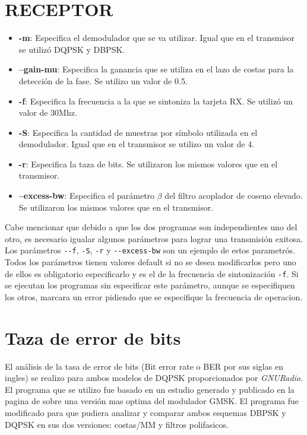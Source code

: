 \section*{RECEPTOR}
\begin{itemize}
  \item \textbf{-m}: Especifica el demodulador que se va utilizar. Igual que en el transmisor se
  utiliz\'o DQPSK y DBPSK.
  \item \textbf{--gain-mu}: Especifica la ganancia que se utiliza en el lazo de costas para la
  detecci\'on de la fase. Se utilizo un valor de 0.5.
  \item \textbf{-f}: Especifica la frecuencia a la que se sintoniza la tarjeta RX. Se utiliz\'o un
  valor de 30Mhz.
  \item \textbf{-S}: Especifica la cantidad de muestras por s\'imbolo utilizada en el demodulador.
  Igual que en el transmisor se utilizo un valor de 4.
  \item \textbf{-r}: Especifica la taza de bits. Se utilizaron los mismos valores que en el
  transmisor.
  \item \textbf{--excess-bw}: Especifica el par\'ametro $\beta$ del filtro acoplador de coseno
  elevado. Se utilizaron los mismos valores que en el transmisor.
\end{itemize}

Cabe mencionar que debido a que los dos programas son independientes uno del otro, es necesario
igualar algunos par\'ametros para lograr una transmisi\'on exitosa. Los par\'ametros \verb|--f|,
\verb|-S|, \verb|-r| y \verb|--excess-bw| son un ejemplo de estos parametr\'os. Todos los
par\'ametros tienen valores default si no se desea modificarlos pero uno de ellos es obligatorio
especificarlo y es el de la frecuencia de sintonizaci\'on \verb|-f|. Si se ejecutan los programas
sin especificar este par\'ametro, aunque se especifiquen los otros, marcara un error pidiendo que
se especifique la frecuencia de operacion. 
\section{Taza de error de bits}

El an\'alisis de la tasa de error de bits (Bit error rate o BER por sus siglas en ingles) se realizo
para ambos modelos de DQPSK proporcionados por \emph{GNURadio}. El programa que se utilizo fue
basado en un estudio generado y publicado en la pagina de \gnuradio sobre una versi\'on mas optima
del modulador GMSK. El programa fue modificado para que pudiera analizar y comparar ambos esquemas
DBPSK y DQPSK en sus dos versiones: costas/MM y filtros polifasicos.

